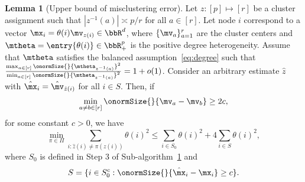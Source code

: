\documentclass[lettersize,onecolumn,journal]{IEEEtran}
\theoremstyle{definition}
\newtheorem{lem}{Lemma}
\theoremstyle{definition}
\begin{document}
\begin{lem}[Upper bound of misclustering error]\label{lem:upper_mis} Let $z: [p] \mapsto [r]$ be a cluster assignment such that $|z^{-1}(a)| \asymp p/r$ for all $a \in [r]$. Let node $i$ correspond to a vector $\mx_i  = \theta(i) \mv_{z(i)} \in \bbR^d$, where $\{\mv_a\}_{a = 1}^r$ are the cluster centers and $\mtheta = \entry{\theta(i)} \in \bbR^p_+$ is the positive degree heterogeneity. Assume that  $\mtheta$ satisfies the balanced assumption~\eqref{eq:degree} such that ${\max_{a \in [r]} \onormSize{}{\mtheta_{z^{-1}(a)}}^2 \over \min_{a \in [r]} \onormSize{}{\mtheta_{z^{-1}(a)}}^2 }= 1 + o(1)$. Consider an arbitrary estimate $\hat z$ with $\hat \mx_i = \hat \mv_{\hat z(i)}$ for all $ i \in S$. Then, if
\begin{equation}
    \min_{a \neq b \in [r]} \onormSize{}{\mv_a - \mv_b} \geq 2c,
\end{equation}
 for some constant $c >0$, we have 
\begin{equation}
    \min_{\pi \in \Pi} \sum_{i : \hat z(i) \neq \pi(z(i))} \theta(i)^2 \leq \sum_{i \in S_0} \theta(i)^2 + 4 \sum_{i \in S} \theta(i)^2,
\end{equation}
where $S_0$ is defined in Step 3 of Sub-algorithm~\hyperref[alg:main]{1} and
\begin{equation}
   S = \{i \in S_0^c: \onormSize{}{\hat \mx_i - \mx_i } \geq c \}.
\end{equation}

\end{lem}
\end{document}
